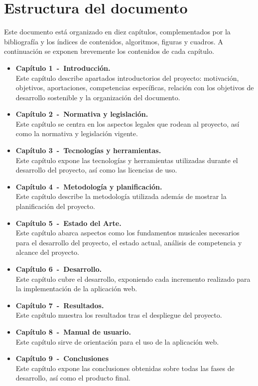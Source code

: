 \section{Estructura del documento}

Este documento está organizado en diez capítulos, complementados por la bibliografía y los índices de contenidos, algoritmos, figuras y cuadros. A continuación se exponen brevemente los contenidos de cada capítulo.

\begin{itemize}
    \item \textbf{Capítulo 1~-~Introducción.} \\
    Este capítulo describe apartados introductorios del proyecto: motivación, objetivos, aportaciones, competencias específicas, relación con los objetivos de desarrollo sostenible y la organización del documento.

    \item \textbf{Capítulo 2~-~Normativa y legislación.} \\
    Este capítulo se centra en los aspectos legales que rodean al proyecto, así como la normativa y legislación vigente.

    \item \textbf{Capítulo 3~-~Tecnologías y herramientas.} \\
    Este capítulo expone las tecnologías y herramientas utilizadas durante el desarrollo del proyecto, así como las licencias de uso.
    
    \item \textbf{Capítulo 4~-~Metodología y planificación.} \\
    Este capítulo describe la metodología utilizada además de mostrar la planificación del proyecto.

    \item \textbf{Capítulo 5~-~Estado del Arte.} \\
    Este capítulo abarca aspectos como los fundamentos musicales necesarios para el desarrollo del proyecto, el estado actual, análisis de competencia y alcance del proyecto.
    
    \item \textbf{Capítulo 6~-~Desarrollo.} \\
    Este capítulo cubre el desarrollo, exponiendo cada incremento realizado para la implementación de la aplicación web.
    
    \item \textbf{Capítulo 7~-~Resultados.} \\
    Este capítulo muestra los resultados tras el despliegue del proyecto.
    
    \item \textbf{Capítulo 8~-~Manual de usuario.} \\
    Este capítulo sirve de orientación para el uso de la aplicación web.
    
    \item \textbf{Capítulo 9~-~Conclusiones} \\
    Este capítulo expone las conclusiones obtenidas sobre todas las fases de desarrollo, así como el producto final.
\end{itemize}